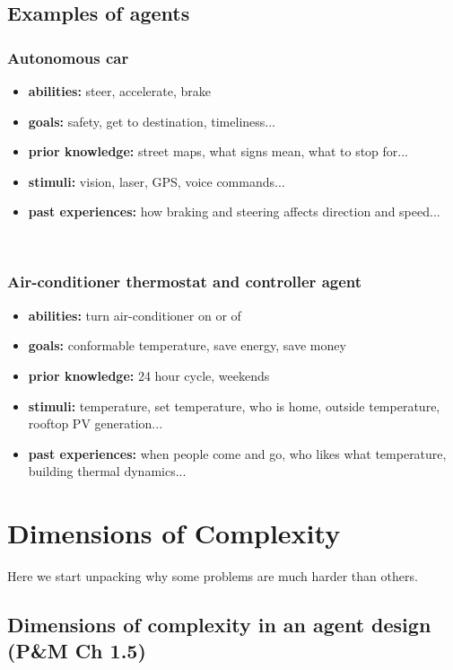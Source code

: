 \documentclass[12pt]{article}
\begin{document}
\newpage
\subsection{Examples of agents}

\subsubsection{Autonomous car}
\begin{itemize}
    \item \textbf{abilities:} steer, accelerate, brake
    \item \textbf{goals:}  safety, get to destination, timeliness...
    \item \textbf{prior knowledge:} street maps, what signs mean, what to stop for...
    \item \textbf{stimuli:} vision, laser, GPS, voice commands...
    \item \textbf{past experiences:}  how braking and steering affects direction and speed...
\end{itemize}\\

\subsubsection{Air-conditioner thermostat and controller agent}
\begin{itemize}
    \item \textbf{abilities:}  turn air-conditioner on or of
    \item \textbf{goals:} conformable temperature, save energy, save money
    \item \textbf{prior knowledge:} 24 hour cycle, weekends
    \item \textbf{stimuli:} temperature, set temperature, who is home, outside temperature, rooftop PV generation...
    \item \textbf{past experiences:} when people come and go, who likes what temperature, building
thermal dynamics...
\end{itemize}

\newpage
\section{Dimensions of Complexity}

Here we start unpacking why some problems are much harder than others.

\subsection{Dimensions of complexity in an agent design (P\&M Ch 1.5)}
\end{document}
